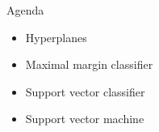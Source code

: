 \begin{frame}{Agenda}

\begin{itemize}
    \item Hyperplanes
    \item Maximal margin classifier
    \item Support vector classifier
    \item Support vector machine
\end{itemize}

\end{frame}

